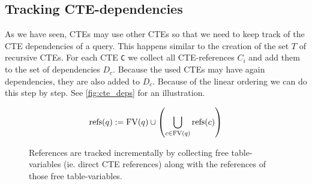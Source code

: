 
\subsection{Tracking CTE-dependencies}\label{tracking_cte_dependencies}
As we have seen, CTEs may use other CTEs so that we need to keep track of the CTE dependencies of a query. This happens similar to the creation of the set $T$ of recursive CTEs. For each CTE \texttt{C} we collect all CTE-references \texttt{$C_i$} and add them to the set of dependencies $D_c$. Because the used CTEs may have again dependencies, they are also added to $D_c$. Because of the linear ordering we can do this step by step. See \autoref{fig:cte_deps} for an illustration.

$$\operatorname{\text{refs}}(q) := \operatorname{\text{\rm FV}}(q) \cup \left(\bigcup_{c \in \operatorname{\text{\rm FV}}(q)} \operatorname{\text{refs}}(c)\right)$$

\begin{figure}[h]
    \centering
    \caption{References are tracked incrementally by collecting free table-variables (ie. direct CTE references) along with the references of those free table-variables.}
    \label{fig:cte_deps}
\end{figure}


